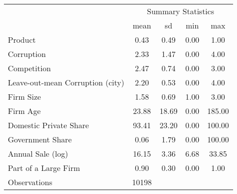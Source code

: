 {
\def\sym#1{\ifmmode^{#1}\else\(^{#1}\)\fi}
\begin{tabular}{l*{1}{cccc}}
\hline\hline
                    &\multicolumn{4}{c}{Summary Statistics}             \\
                    &        mean&          sd&         min&         max\\
\hline
Product             &        0.43&        0.49&        0.00&        1.00\\
Corruption          &        2.33&        1.47&        0.00&        4.00\\
Competition         &        2.47&        0.74&        0.00&        3.00\\
Leave-out-mean Corruption (city)&        2.20&        0.53&        0.00&        4.00\\
Firm Size           &        1.58&        0.69&        1.00&        3.00\\
Firm Age            &       23.88&       18.69&        0.00&      185.00\\
Domestic Private Share&       93.41&       23.20&        0.00&      100.00\\
Government Share    &        0.06&        1.79&        0.00&      100.00\\
Annual Sale (log)   &       16.15&        3.36&        6.68&       33.85\\
Part of a Large Firm&        0.90&        0.30&        0.00&        1.00\\
\hline
Observations        &       10198&            &            &            \\
\hline\hline
\end{tabular}
}
